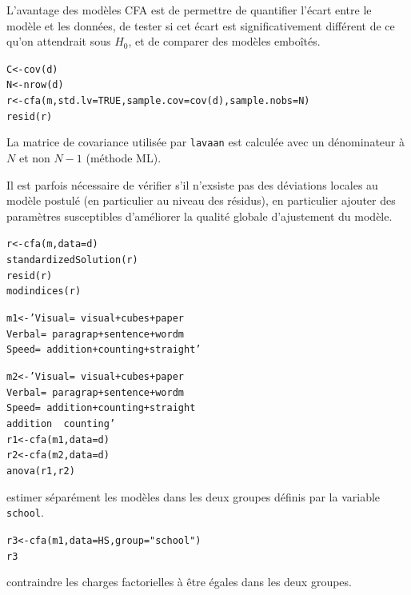 L'avantage des modèles CFA est de permettre de quantifier l'écart entre le
modèle et les données, de tester si cet écart est significativement différent de
ce qu'on attendrait sous $H_0$, et de comparer des modèles emboîtés.

\begin{alltt}
C <- cov(d)
N <- nrow(d)
r <- cfa(m, std.lv = TRUE, sample.cov = cov(d), sample.nobs = N)
resid(r)
\end{alltt}

La matrice\mark{} de covariance utilisée par \texttt{lavaan} est calculée avec
  un dénominateur à $N$ et non $N-1$ (méthode ML).


Il est parfois nécessaire de vérifier s'il n'exsiste pas des déviations locales
au modèle postulé (en particulier au niveau des résidus), en particulier ajouter
des paramètres susceptibles d'améliorer la qualité globale d'ajustement du
modèle\autocite{brown06}.
\begin{alltt}
r <- cfa(m, data = d)
standardizedSolution(r)
resid(r)       
modindices(r)  
\end{alltt}


\foilhead{}

\begin{alltt}
m1 <- 'Visual =~ visual + cubes + paper 
       Verbal =~ paragrap + sentence + wordm
       Speed  =~ addition + counting + straight'

m2 <- 'Visual =~ visual + cubes + paper 
       Verbal =~ paragrap + sentence + wordm
       Speed  =~ addition + counting + straight
       addition ~~ counting'  
r1 <- cfa(m1, data = d)
r2 <- cfa(m2, data = d)
anova(r1, r2)                 
\end{alltt}


 estimer séparément les modèles dans les deux groupes définis
par la variable \texttt{school}.

\begin{alltt}
r3 <- cfa(m1, data = HS, group = "school")
r3
\end{alltt}

 contraindre les charges factorielles à être
égales dans les deux groupes.


